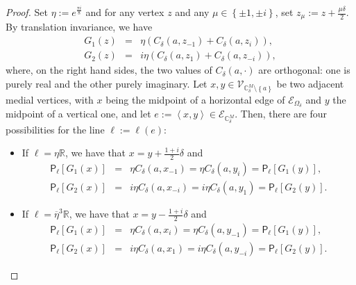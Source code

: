 \documentclass[oneside,english]{amsart}
\numberwithin{equation}{section}
\numberwithin{figure}{section}
\theoremstyle{plain}
\theoremstyle{plain}
\theoremstyle{plain}
\theoremstyle{plain}
\theoremstyle{plain}
\theoremstyle{definition}
\theoremstyle{remark}
\begin{document}
\begin{proof}
Set $\eta:=e^{\frac{\pi i}{8}}$ and for any vertex $z$ and any $\mu\in\left\{ \pm1,\pm i\right\} $,
set $z_{\mu}:=z+\frac{\mu\delta}{2}$. By translation invariance,
we have
\begin{eqnarray*}
G_{1}\left(z\right) & = & \eta\left(C_{\delta}\left(a,z_{-1}\right)+C_{\delta}\left(a,z_{i}\right)\right),\\
G_{2}\left(z\right) & = & i\eta\left(C_{\delta}\left(a,z_{1}\right)+C_{\delta}\left(a,z_{-i}\right)\right),
\end{eqnarray*}
where, on the right hand sides, the two values of $C_{\delta}\left(a,\cdot\right)$
are orthogonal: one is purely real and the other purely imaginary.
Let $x,y\in\mathcal{V}_{\mathbb{C}_{\delta}^{M}\setminus\left\{ a\right\} }$
be two adjacent medial vertices, with $x$ being the midpoint of a
horizontal edge of $\mathcal{E}_{\Omega_{\delta}}$ and $y$ the midpoint
of a vertical one, and let $e:=\left\langle x,y\right\rangle \in\mathcal{E}_{\mathbb{C}_{\delta}^{M}}$.
Then, there are four possibilities for the line $\ell:=\ell\left(e\right)$: 
\begin{itemize}
\item If $\ell=\eta\mathbb{R}$, we have that $x=y+\frac{1+i}{2}\delta$
and 
\begin{eqnarray*}
\mathsf{P}_{\ell}\left[G_{1}\left(x\right)\right] & = & \eta C_{\delta}\left(a,x_{-1}\right)=\eta C_{\delta}\left(a,y_{i}\right)=\mathsf{P}_{\ell}\left[G_{1}\left(y\right)\right],\\
\mathsf{P}_{\ell}\left[G_{2}\left(x\right)\right] & = & i\eta C_{\delta}\left(a,x_{-i}\right)=i\eta C_{\delta}\left(a,y_{1}\right)=\mathsf{P}_{\ell}\left[G_{2}\left(y\right)\right].
\end{eqnarray*}
 
\item If $\ell=\overline{\eta}^{3}\mathbb{R}$, we have that $x=y-\frac{1+i}{2}\delta$
and 
\begin{eqnarray*}
\mathsf{P}_{\ell}\left[G_{1}\left(x\right)\right] & = & \eta C_{\delta}\left(a,x_{i}\right)=\eta C_{\delta}\left(a,y_{-1}\right)=\mathsf{P}_{\ell}\left[G_{1}\left(y\right)\right],\\
\mathsf{P}_{\ell}\left[G_{2}\left(x\right)\right] & = & i\eta C_{\delta}\left(a,x_{1}\right)=i\eta C_{\delta}\left(a,y_{-i}\right)=\mathsf{P}_{\ell}\left[G_{2}\left(y\right)\right].
\end{eqnarray*}


\end{itemize}
\end{proof}
\end{document}
